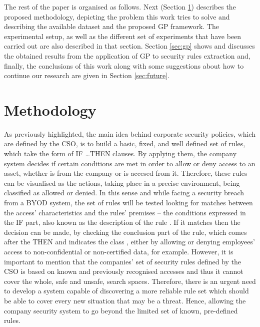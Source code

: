\documentclass[runningheads]{llncs}
\begin{document}
The rest of the paper is organised as follows. Next (Section
\ref{sec:methodology}) describes the proposed methodology, depicting
the problem this work tries to solve and describing the available
dataset and the proposed GP framework. The experimental setup, as
well as the different set of experiments that have been carried out
are also described in that section. Section \ref{sec:gp} shows and discusses the
obtained results from the application of GP to security rules
extraction and, finally, the conclusions of this work along with some
suggestions about how to continue our research are given in Section
\ref{sec:future}.

\section{Methodology}
\label{sec:methodology}

As previously highlighted, the main idea behind corporate security
policies, which are defined by the CSO, is to build a basic, fixed,
and well defined set of rules, which take the form of \textsc{IF
  \ldots THEN} clauses. By applying them, the company system decides if certain conditions are met in order to allow or
deny access to an asset, whether is from the company or is accesed from it. 
Therefore, these rules can be visualised as the actions, taking place in a precise environment, being classified as
allowed or denied. In this sense and while facing a security breach
from a BYOD system, the set of rules will be tested looking for
matches between the access' characteristics and the rules' premises --
the conditions expressed in the IF part, also known as the description
of the rule \cite{DeFalco2002257}. If it matches then the decision can
be made, by checking the conclusion part of the rule, which comes
after the THEN and indicates the class \cite{DeFalco2002257}, either
by allowing or denying employees' access to non-confidential
 or non-certified data, for example. However, it is important to
 mention that the companies'  set of security rules defined by the CSO is
 based on known and previously recognised accesses and thus it cannot
 cover the whole, safe and unsafe, search spaces. Therefore,
 there is an urgent need to develop a system capable of discovering a
 more reliable rule set which should be able to cover every new
 situation that may be a threat. Hence, allowing the company security
 system to go beyond the limited set of known, pre-defined rules.  %
\end{document}
